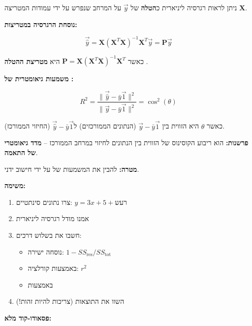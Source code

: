 
ניתן לראות רגרסיה ליניארית כ\textbf{הטלה} של $\vec{y}$ על המרחב שנפרש על ידי עמודות המטריצה $\mathbf{X}$.

\textbf{נוסחת הרגרסיה במטריצות:}

\begin{equation}
\vec{\hat{y}} = \mathbf{X}(\mathbf{X}^T\mathbf{X})^{-1}\mathbf{X}^T\vec{y} = \mathbf{P}\vec{y}
\end{equation}

כאשר $\mathbf{P} = \mathbf{X}(\mathbf{X}^T\mathbf{X})^{-1}\mathbf{X}^T$ היא \textbf{מטריצת ההטלה} .

\textbf{משמעות גיאומטרית של \Rsquared{}:}

\[
R^2 = \frac{\|\vec{\hat{y}} - \bar{y}\vec{1}\|^2}{\|\vec{y} - \bar{y}\vec{1}\|^2} = \cos^2(\theta)
\]

כאשר $\theta$ היא הזווית בין $\vec{y} - \bar{y}\vec{1}$ (הנתונים הממורכזים) ל\en{-}$\vec{\hat{y}} - \bar{y}\vec{1}$ (החיזוי הממורכז).

\textbf{פרשנות:} \Rsquared{} הוא ריבוע הקוסינוס של הזווית בין הנתונים לחיזוי במרחב הממורכז – \textbf{מדד גיאומטרי של התאמה}.


\textbf{מטרה:} להבין את המשמעות של \Rsquared{} על ידי חישוב ידני.

\textbf{משימה:}

\begin{enumerate}
\item צרו נתונים סינתטיים: $y = \num{3}x + \num{5} + \text{רעש}$
\item אמנו מודל רגרסיה ליניארית
\item חשבו את \Rsquared{} בשלוש דרכים:
\begin{itemize}
\item נוסחה ישירה: $1 - SS_{\text{res}}/SS_{\text{tot}}$
\item באמצעות קורלציה: $r^2$
\item באמצעות 
\end{itemize}
\item השוו את התוצאות (צריכות להיות זהות!)
\end{enumerate}

\textbf{פסאודו-קוד מלא:}

